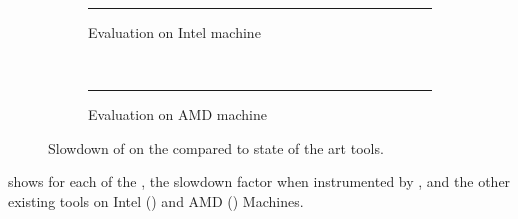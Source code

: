 \begin{figure*}[htb]
    \centering
    \begin{subfigure}{.49\linewidth}
        \rule{8cm}{7cm}
        \caption{Evaluation on Intel machine}
        \label{fig:ovh-Intel}
    \end{subfigure}
    ~
    \begin{subfigure}{.49\linewidth}
        \rule{8cm}{7cm}
        \caption{Evaluation on AMD machine}
        \label{fig:ovh-AMD}
    \end{subfigure}
    \caption{Slowdown of \Moca on the \NPB compared to state of the art tools.}
    \label{fig:ovh}
\end{figure*}

 shows for each of the \NPB, the slowdown factor when
instrumented by \Moca, \MocaPin and the other existing tools on Intel
() and AMD () Machines.


